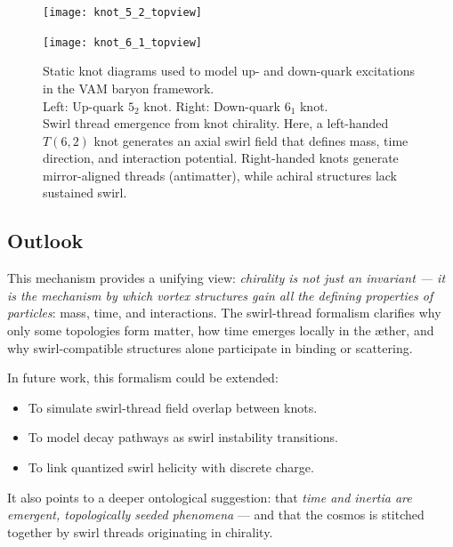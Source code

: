 \documentclass[a4paper,12pt]{article}
\begin{document}
    \begin{figure}[H]
        \centering
        \begin{minipage}{0.25\textwidth}
            \centering
            \texttt{[image: knot\_5\_2\_topview]}
        \end{minipage}
        \hspace{1em}
        \begin{minipage}{0.25\textwidth}
            \centering
            \texttt{[image: knot\_6\_1\_topview]}
        \end{minipage}
        \caption{Static knot diagrams used to model up- and down-quark excitations in the VAM baryon framework.\\
        Left: Up-quark \(5_2\) knot. Right: Down-quark \(6_1\) knot.\\
        Swirl thread emergence from knot chirality. Here, a left-handed $T(6,2)$ knot generates an axial swirl field that defines mass, time direction, and interaction potential. Right-handed knots generate mirror-aligned threads (antimatter), while achiral structures lack sustained swirl.}
        \label{fig:chiralsummary}
    \end{figure}



    \subsection*{Outlook}

    This mechanism provides a unifying view: \textit{chirality is not just an invariant — it is the mechanism by which vortex structures gain all the defining properties of particles}: mass, time, and interactions. The swirl-thread formalism clarifies why only some topologies form matter, how time emerges locally in the æther, and why swirl-compatible structures alone participate in binding or scattering.

    In future work, this formalism could be extended:
    \begin{itemize}
        \item To simulate swirl-thread field overlap between knots.
        \item To model decay pathways as swirl instability transitions.
        \item To link quantized swirl helicity with discrete charge.
    \end{itemize}

    It also points to a deeper ontological suggestion: that \textit{time and inertia are emergent, topologically seeded phenomena} — and that the cosmos is stitched together by swirl threads originating in chirality.
\end{document}
